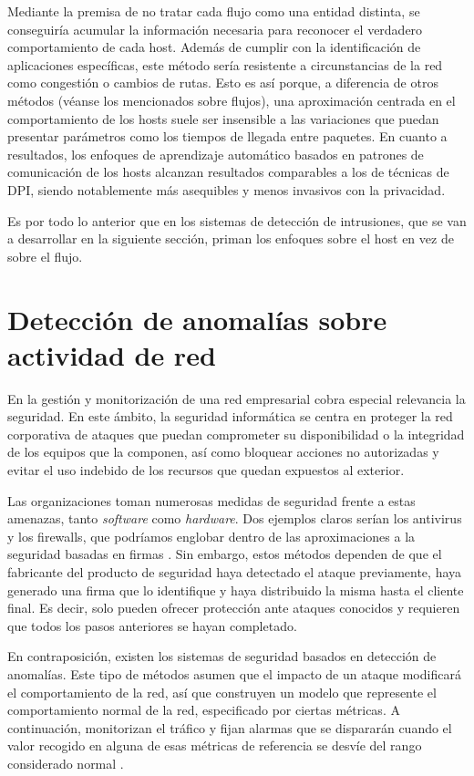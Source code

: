 Mediante la premisa de no tratar cada flujo como una entidad distinta, se conseguiría acumular la información necesaria para reconocer el verdadero comportamiento de cada host.
Además de cumplir con la identificación de aplicaciones específicas, este método sería resistente a circunstancias de la red como congestión o cambios de rutas.
Esto es así porque, a diferencia de otros métodos (véanse los mencionados sobre flujos), una aproximación centrada en el comportamiento de los hosts
suele ser insensible a las variaciones que puedan presentar parámetros como los tiempos de llegada entre paquetes.
En cuanto a resultados, los enfoques de aprendizaje automático basados en patrones de comunicación de los hosts alcanzan resultados comparables a los de técnicas de DPI,
siendo notablemente más asequibles y menos invasivos con la privacidad.

Es por todo lo anterior que en los sistemas de detección de intrusiones, que se van a desarrollar en la siguiente sección, priman los enfoques sobre el host en vez de sobre el flujo.

\section{Detección de anomalías sobre actividad de red}\label{detectanomsobreactividadred}

En la gestión y monitorización de una red empresarial cobra especial relevancia la seguridad.
En este ámbito, la seguridad informática se centra en proteger la red corporativa de ataques que puedan comprometer su disponibilidad o la integridad de los equipos que la componen, así como
bloquear acciones no autorizadas y evitar el uso indebido de los recursos que quedan expuestos al exterior.

Las organizaciones toman numerosas medidas de seguridad frente a estas amenazas, tanto \emph{software} como \emph{hardware}.
Dos ejemplos claros serían los antivirus y los firewalls, que podríamos englobar dentro de las aproximaciones a la seguridad basadas en firmas \cite{Alconzo_2019}.
Sin embargo, estos métodos dependen de que el fabricante del producto de seguridad haya detectado el ataque previamente, haya generado una firma que lo identifique y haya distribuido la misma hasta el cliente final.
Es decir, solo pueden ofrecer protección ante ataques conocidos y requieren que todos los pasos anteriores se hayan completado.

En contraposición, existen los sistemas de seguridad basados en detección de anomalías.
Este tipo de métodos asumen que el impacto de un ataque modificará el comportamiento de la red, así que construyen un modelo que represente el comportamiento normal de la red, especificado por ciertas métricas.
A continuación, monitorizan el tráfico y fijan alarmas que se dispararán cuando el valor recogido en alguna de esas métricas de referencia se desvíe del rango considerado normal \cite{Boutaba_2018}.

